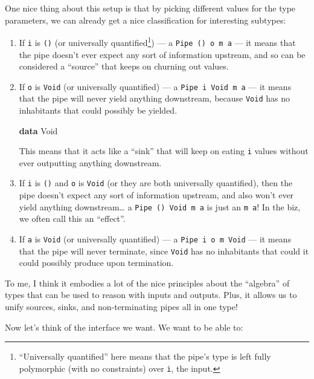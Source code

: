 \documentclass[]{article}
\newenvironment{Shaded}{}{}
\newcommand{\DataTypeTok}[1]{\textcolor[rgb]{0.56,0.13,0.00}{#1}}
\newcommand{\KeywordTok}[1]{\textcolor[rgb]{0.00,0.44,0.13}{\textbf{#1}}}
\begin{document}
One nice thing about this setup is that by picking different values for the type
parameters, we can already get a nice classification for interesting subtypes:

\begin{enumerate}
\def\labelenumi{\arabic{enumi}.}
\item
  If \texttt{i} is \texttt{()} (or universally quantified\footnote{``Universally
    quantified'' here means that the pipe's type is left fully polymorphic (with
    no constraints) over \texttt{i}, the input.}) --- a
  \texttt{Pipe\ ()\ o\ m\ a} --- it means that the pipe doesn't ever expect any
  sort of information upstream, and so can be considered a ``source'' that keeps
  on churning out values.
\item
  If \texttt{o} is \texttt{Void} (or universally quantified) --- a
  \texttt{Pipe\ i\ Void\ m\ a} --- it means that the pipe will never yield
  anything downstream, because \texttt{Void} has no inhabitants that could
  possibly be yielded.

\begin{Shaded}
\begin{Highlighting}[]
\KeywordTok{data} \DataTypeTok{Void}
\end{Highlighting}
\end{Shaded}

  This means that it acts like a ``sink'' that will keep on eating \texttt{i}
  values without ever outputting anything downstream.
\item
  If \texttt{i} is \texttt{()} and \texttt{o} is \texttt{Void} (or they are both
  universally quantified), then the pipe doesn't expect any sort of information
  upstream, and also won't ever yield anything downstream\ldots{} a
  \texttt{Pipe\ ()\ Void\ m\ a} is just an \texttt{m\ a}! In the biz, we often
  call this an ``effect''.
\item
  If \texttt{a} is \texttt{Void} (or universally quantified) --- a
  \texttt{Pipe\ i\ o\ m\ Void} --- it means that the pipe will never terminate,
  since \texttt{Void} has no inhabitants that could it could possibly produce
  upon termination.
\end{enumerate}

To me, I think it embodies a lot of the nice principles about the ``algebra'' of
types that can be used to reason with inputs and outputs. Plus, it allows us to
unify sources, sinks, and non-terminating pipes all in one type!

Now let's think of the interface we want. We want to be able to:
\end{document}
